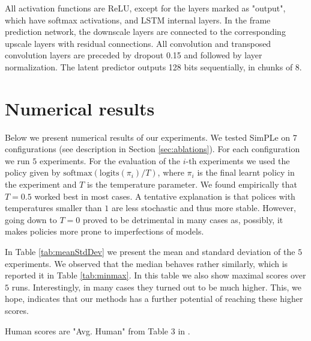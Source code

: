 All activation functions are ReLU, except for the layers marked as "output", which have softmax activations, and LSTM internal layers. In the frame prediction network, the downscale layers are connected to the corresponding upscale layers with residual connections. All convolution and transposed convolution layers are preceded by dropout 0.15 and followed by layer normalization. The latent predictor outputs 128 bits sequentially, in chunks of 8.

\newpage

\section{Numerical results}\label{numerical_results}
Below we present numerical results of our experiments. We tested SimPLe on $7$ configurations (see description in Section \ref{sec:ablations}). For each configuration we run $5$ experiments. For the evaluation of the $i$-th experiments we used the policy given by $\text{softmax}(\text{logits}(\pi_i)/T)$, where  $\pi_i$ is the final learnt policy in the experiment and $T$ is the temperature parameter. We found empirically that $T=0.5$ worked best in most cases. A tentative explanation is that polices with temperatures smaller than $1$ are less stochastic and thus more stable. However, going down to $T=0$ proved to be detrimental in many cases as, possibly, it makes policies more prone to imperfections of models. 

In Table \ref{tab:meanStdDev} we present the mean and standard deviation of the $5$ experiments. We observed that the median behaves rather similarly, which is reported it in Table \ref{tab:minmax}. In this table we also show maximal scores over $5$ runs. Interestingly, in many cases they turned out to be much higher. This, we hope, indicates that our methods has a further potential of reaching these higher scores. 

Human scores are "Avg. Human" from Table 3 in \cite{Pohlenetal2018}.

\newenvironment{changemargin}[2]{%
\begin{list}{}{%
\setlength{\topsep}{0pt}%
\setlength{\leftmargin}{#1}%
\setlength{\rightmargin}{#2}%
\setlength{\listparindent}{\parindent}%
\setlength{\itemindent}{\parindent}%
\setlength{\parsep}{\parskip}%
}%
\item[]}{\end{list}}


